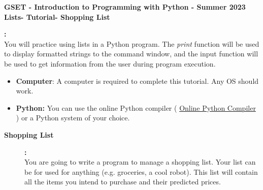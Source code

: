 \documentclass[12pt]{article}
\newcommand{\MNUM}{4} %
\newcommand{\MNAME}{Lists} %
\newcommand{\TNAME}{Shopping List} %
\begin{document}
\thispagestyle{plain}

\begin{center}
   {\bf \large GSET - Introduction to Programming with Python - Summer 2023} \vspace{5mm}\\
   {\bf \Large \MNAME \hspc -  Tutorial\hspc\MNUM\hspc - \TNAME}\vspace{3mm}\\
   
\end{center}


\begin{description}[labelindent=1cm]
	
			\item [\textbf{ \Large Overview}] \textbf{ \Large :}\\
			You will practice using lists in a Python program. The {\it print} function will be used to display formatted strings to the command window, and the input function will be used to get information from the user during program execution. \\
 	
	\item[\textbf{\underline{System Requirements:}}] \hfill \vspace{0mm}

\begin{itemize}
	\item {\bf Computer}: A computer is required to complete this tutorial. Any OS should work.
	\item {\bf Python:} You can use the online Python compiler ( \href{https://www.online-python.com/online_python_compiler}{Online Python Compiler}  ) or a Python system of your choice.
\end{itemize}

	\item[\textbf{\underline{Background:}}] \hfill \vspace{0mm}
	
	\begin{description}

	 	\item [\textbf{Shopping List }] \textbf{ \Large :}\\   
            You are going to write a program to manage a shopping list. Your list can be for used for anything (e.g. groceries, a cool robot). This list will contain all the items you intend to purchase and their predicted prices.
            

\end{description}
\end{description}
\end{document}
